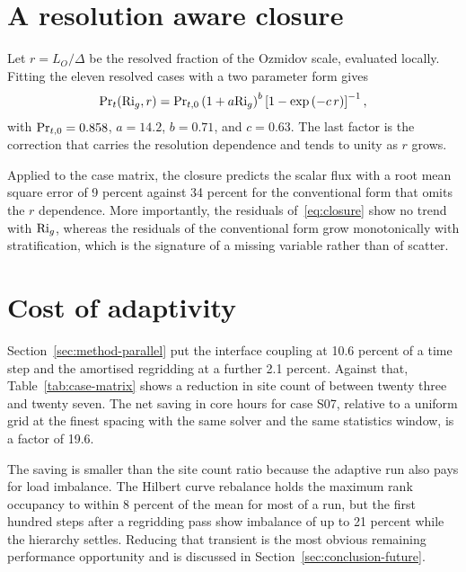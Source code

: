 \section{A resolution aware closure}
\label{sec:results-closure}

Let $r = L_O / \Delta$ be the resolved fraction of the Ozmidov scale, evaluated
locally. Fitting the eleven resolved cases with a two parameter form gives
\begin{equation}
  \mathrm{Pr}_t(\mathrm{Ri}_g, r) = \mathrm{Pr}_{t,0}
    \left( 1 + a \mathrm{Ri}_g \right)^{b}
    \left[ 1 - \exp\left( -c \, r \right) \right]^{-1},
  \label{eq:closure}
\end{equation}
with $\mathrm{Pr}_{t,0} = 0.858$, $a = 14.2$, $b = 0.71$, and $c = 0.63$. The last
factor is the correction that carries the resolution dependence and tends to
unity as $r$ grows.

Applied to the case matrix, the closure predicts the scalar flux with a root
mean square error of 9 percent against 34 percent for the conventional form that
omits the $r$ dependence. More importantly, the residuals of~\eqref{eq:closure}
show no trend with $\mathrm{Ri}_g$, whereas the residuals of the conventional form grow
monotonically with stratification, which is the signature of a missing variable
rather than of scatter.

\section{Cost of adaptivity}
\label{sec:results-cost}

Section~\ref{sec:method-parallel} put the interface coupling at 10.6 percent of
a time step and the amortised regridding at a further 2.1 percent. Against that,
Table~\ref{tab:case-matrix} shows a reduction in site count of between twenty
three and twenty seven. The net saving in core hours for case S07, relative to a
uniform grid at the finest spacing with the same solver and the same statistics
window, is a factor of 19.6.

The saving is smaller than the site count ratio because the adaptive run also
pays for load imbalance. The Hilbert curve rebalance holds the maximum rank
occupancy to within 8 percent of the mean for most of a run, but the first
hundred steps after a regridding pass show imbalance of up to 21 percent while
the hierarchy settles. Reducing that transient is the most obvious remaining
performance opportunity and is discussed in Section~\ref{sec:conclusion-future}.
